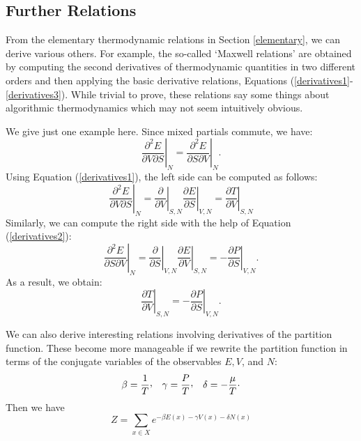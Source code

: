 \documentclass[12pt,twoside,openright]{report}
\begin{document}
\subsection{Further Relations} \label{maxwell}

From the elementary thermodynamic relations in Section 
\ref{elementary}, we can derive various others. For example, the so-called `Maxwell relations' are obtained by computing the second derivatives of thermodynamic quantities in two different orders and then applying the basic derivative relations, Equations (\ref{derivatives1}-\ref{derivatives3}).  While trivial to prove, these relations say some things about algorithmic thermodynamics which may not seem intuitively obvious.

We give just one example here.  Since mixed partials commute, we have:
\[  \left.\frac{\partial^2 E}{\partial V \partial S}\right|_N = 
\left.\frac{\partial^2 E}{\partial S \partial V}\right|_N . \]
Using Equation (\ref{derivatives1}), the left side can be computed as follows:
\[  \left.\frac{\partial^2 E}{\partial V \partial S}\right|_N = 
\left.\frac{\partial}{\partial V}\right|_{S,N}
\left.\frac{\partial E}{\partial S}\right|_{V,N} = 
\left.\frac{\partial T}{\partial V}\right|_{S,N}  \]
Similarly, we can compute the right side with the help of Equation (\ref{derivatives2}):
\[  \left.\frac{\partial^2 E}{\partial S \partial V}\right|_N = 
\left.\frac{\partial}{\partial S}\right|_{V,N}
\left.\frac{\partial E}{\partial V}\right|_{S,N} = 
-\left.\frac{\partial P}{\partial S}\right|_{V,N} . \]
As a result, we obtain:
\[  \left.\frac{\partial T}{\partial V}\right|_{S,N}  =
-\left.\frac{\partial P}{\partial S}\right|_{V,N} . \]

We can also derive interesting relations involving derivatives of the partition function.  These become more manageable if we rewrite the partition function in terms of the conjugate variables of the observables $E, V$, and $N$:
\begin{equation}
\label{new.variables}
   \beta = \frac{1}{T}\raisebox{0.4ex}{,} \quad
 \gamma =  \frac{P}{T}\raisebox{0.4ex}{,}  \quad
\delta = -\frac{\mu}{T}\raisebox{0.4ex}.
\end{equation}
Then we have
\[     Z = \sum_{x \in X} e^{-\beta E(x) -\gamma V(x) - \delta N(x)} \]
\end{document}
